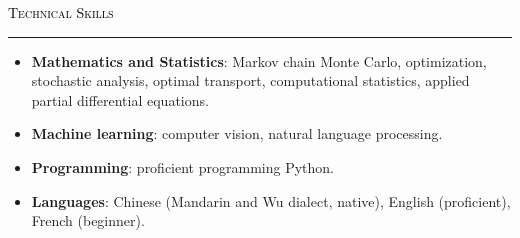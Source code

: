 \documentclass{resume} %
\renewenvironment{rSection}[1]{
\sectionskip
\textcolor{black}{\textsc{#1}}
\sectionlineskip
\hrule
\begin{list}{}{
\setlength{\leftmargin}{1.5em}
}
\item[]
}{
\end{list}
}
\begin{document}
    
\begin{rSection}{Technical Skills} \itemsep -2pt
\begin{itemize}[leftmargin=0in]
    \item \textbf{Mathematics and Statistics}: Markov chain Monte Carlo, optimization, stochastic analysis, optimal transport, computational statistics, applied partial differential equations.
    \item \textbf{Machine learning}: computer vision, natural language processing.
    \item \textbf{Programming}: proficient programming Python.
    \item \textbf{Languages}: Chinese (Mandarin and Wu dialect, native), English (proficient), French (beginner).
\end{itemize}
    

\end{rSection}
\end{document}
